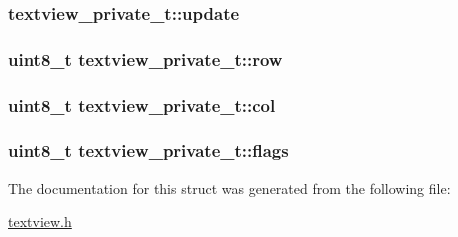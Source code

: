 \hypertarget{structtextview__private__t_f53f840c067dfc4ed2beb2ac6e78fef1}{
\subsubsection{ {\bf textview\_\-private\_\-t::update}}}
\label{structtextview__private__t_f53f840c067dfc4ed2beb2ac6e78fef1}


\hypertarget{structtextview__private__t_ad6a939ebae8152e0cd7458af44b92c9}{
\subsubsection{\setlength{\rightskip}{0pt plus 5cm}uint8\_\-t {\bf textview\_\-private\_\-t::row}}}
\label{structtextview__private__t_ad6a939ebae8152e0cd7458af44b92c9}


\hypertarget{structtextview__private__t_0f7a980fe4f1fa857e9b49d73c65a9bd}{
\subsubsection{\setlength{\rightskip}{0pt plus 5cm}uint8\_\-t {\bf textview\_\-private\_\-t::col}}}
\label{structtextview__private__t_0f7a980fe4f1fa857e9b49d73c65a9bd}


\hypertarget{structtextview__private__t_291b0574c0d4076365e4ac0519708954}{
\subsubsection{\setlength{\rightskip}{0pt plus 5cm}uint8\_\-t {\bf textview\_\-private\_\-t::flags}}}
\label{structtextview__private__t_291b0574c0d4076365e4ac0519708954}




The documentation for this struct was generated from the following file:\begin{CompactItemize}
\item 
\hyperlink{textview_8h}{textview.h}\end{CompactItemize}
